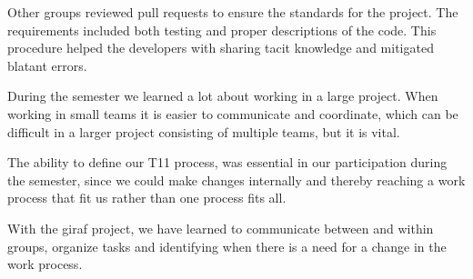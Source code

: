 Other groups reviewed pull requests to ensure the standards for the project. The requirements included both testing and proper descriptions of the code. This procedure helped the developers with sharing tacit knowledge and mitigated blatant errors.

During the semester we learned a lot about working in a large project. When working in small teams it is easier to communicate and coordinate, which can be difficult in a larger project consisting of multiple teams, but it is vital. 

The ability to define our \gls{T11} process, was essential in our participation during the semester, since we could make changes internally and thereby reaching a work process that fit us rather than one process fits all. 

With the \gls{giraf} project, we have learned to communicate between and within groups, organize tasks and identifying when there is a need for a change in the work process. 
